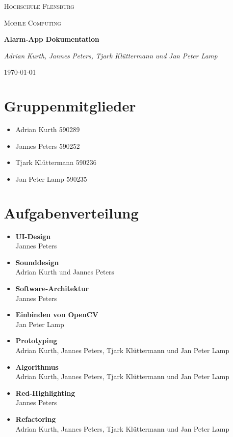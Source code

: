 \documentclass[11pt]{article}
\begin{document}
	\begin{titlepage}
		\centering
		{\scshape\LARGE Hochschule Flensburg\par}
		\vspace{1cm}
		{\scshape\Large Mobile Computing\par}
		\vspace{1.5cm}
		{\huge\bfseries Alarm-App Dokumentation\par}
		\vspace{2cm}
		{\Large\itshape Adrian Kurth, Jannes Peters, Tjark Kl{\"u}ttermann und Jan Peter Lamp\par}

		
		\vfill
		
		{\large \today\par}
	\end{titlepage}
\section{Gruppenmitglieder}
\begin{itemize}
	\item Adrian Kurth 590289
	\item Jannes Peters 590252
	\item Tjark Kl{\"u}ttermann 590236
	\item Jan Peter Lamp 590235
\end{itemize}
\section{Aufgabenverteilung}
\begin{itemize}
	\item {\bf UI-Design}\\ Jannes Peters
	\item {\bf Sounddesign}\\ Adrian Kurth und Jannes Peters
	\item {\bf Software-Architektur}\\ Jannes Peters
	\item {\bf Einbinden von OpenCV}\\ Jan Peter Lamp
	\item {\bf Prototyping} \\ Adrian Kurth, Jannes Peters, Tjark Kl{\"u}ttermann und Jan Peter Lamp
	\item {\bf Algorithmus}\\ Adrian Kurth, Jannes Peters, Tjark Kl{\"u}ttermann und Jan Peter Lamp
	\item {\bf Red-Highlighting}\\ Jannes Peters
	\item {\bf Refactoring}\\ Adrian Kurth, Jannes Peters, Tjark Kl{\"u}ttermann und Jan Peter Lamp
\end{itemize}
\end{document}
